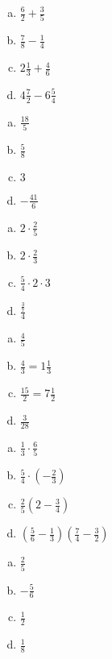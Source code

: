 \begin{tehtava}

\begin{enumerate}[a)]
	\item $\frac{6}{2} + \frac{3}{5}$
	\item $\frac{7}{8} - \frac{1}{4}$
	\item $2 \frac{1}{3} + \frac{4}{6}$
	\item $4 \frac{7}{2} - 6 \frac{5}{4}$
\end{enumerate}
    \begin{vastaus}		
		\begin{enumerate}[a)]
			\item $\frac{18}{5}$
			\item $\frac{5}{8}$
			\item $3$
			\item $-\frac{41}{6}$ 
		\end{enumerate}
    \end{vastaus}
\end{tehtava}

\begin{tehtava}

\begin{enumerate}[a)]
	\item $2 \cdot \frac{2}{5}$
	\item $2 \cdot \frac{2}{3}$
	\item $\frac{5}{4} \cdot 2 \cdot 3$
	\item $\frac{\frac{3}{7}}{4}$ 
\end{enumerate}
    \begin{vastaus}
		\begin{enumerate}[a)]
			\item $\frac{4}{5}$
			\item $\frac{4}{3} = 1 \frac{1}{3}$
			\item $\frac{15}{2} = 7 \frac{1}{2}$
			\item $\frac{3}{28}$
		\end{enumerate}
    \end{vastaus}
\end{tehtava}

\begin{tehtava}

\begin{enumerate}[a)]
	\item $\frac{1}{3} \cdot \frac{6}{5}$
	\item $\frac{5}{4} \cdot (-\frac{2}{3})$ 
	\item $\frac{2}{5} (2 - \frac{3}{4})$
	\item $(\frac{5}{6} - \frac{1}{3})(\frac{7}{4} - \frac{3}{2})$
\end{enumerate}
    \begin{vastaus}		
		\begin{enumerate}[a)]
			\item $\frac{2}{5}$
			\item $-\frac{5}{6}$
			\item $\frac{1}{2}$
			\item $\frac{1}{8}$ 
		\end{enumerate}
    \end{vastaus}
\end{tehtava}

